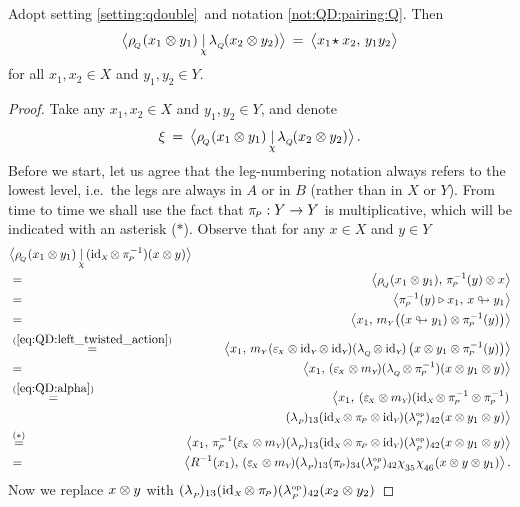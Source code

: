 \begin{prop}  \label{prop:qdouble:multiplicative}
Adopt setting \ref{setting:qdouble}\ and notation \ref{not:QD:pairing:Q}\@. Then
$$ \pairflipM{\rQ(x_1 \tens y_1)}{\lQ(x_2 \tens y_2)}
        \:=\:  \pairM{x_1 \!\star x_2}{y_1 y_2} $$
for all\/ $x_1,x_2 \in X$ and\/ $y_1,y_2 \in Y$.
\end{prop}
\begin{proof}
Take any $x_1,x_2 \in X$ and\/ $y_1,y_2 \in Y$, and denote
$$ \xi \:=\: \pairflipM{\rQ(x_1 \tens y_1)}{\lQ(x_2 \tens y_2)}. $$
Before we start, let us agree that the leg-numbering notation always refers to the
lowest level, i.e.\ the legs are always in $A$ or in $B$ (rather than in $X$ or $Y$).
From time to time we shall use the fact that $\pi_{\scriptscriptstyle \! P} : Y \rightarrow Y$ is multiplicative,
which will be indicated with an asterisk ($*$).
Observe that for any $x\in X$ and $y\in Y$
\begin{eqnarray*}
\lefteqn{\pairflipM{\rQ(x_1 \tens y_1)}{(\idX \tens \piP^{-1})(x \tens y)}}
\\&=&
\pairM{\rQ(x_1 \tens y_1)}{\piP^{-1}(y) \tens x}
\\&=&
\pairM{\piP^{-1}(y) \lact x_1}{x \ltact y_1}
\\&=&
\pairM{x_1}{\mult{Y} \! \left((x \ltact y_1) \tens \piP^{-1}(y) \vertM\right)}
\\&\stackrel{(\ref{eq:QD:left_twisted_action})}{=}&
\pairM{x_1}{\mult{Y} (\epsX \tens \idY \tens \idY)
             (\lQ \tens \idY)\left(x \tens y_1 \tens \piP^{-1}(y) \vertM\right)}
\\&=&
\pairM{x_1}{(\epsX \tens \mult{Y}\!)
                (\lQ \tens \piP^{-1})(x \tens y_1 \tens y)}
\\&\stackrel{(\ref{eq:QD:alpha})}{=}&
\left\langle x_1,\: (\epsX \tens \mult{Y}\!)
      (\idX \tens \piP^{-1} \tens \piP^{-1})
\right. \\&& \hspace{5em}\left.
   (\lp)_{13} (\idX \tens \piP \tens \idY)
      (\lpop)_{42} (x \tens y_1 \tens y)  \right \rangle
\\&\stackrel{(*)}{=}&
\pairM{x_1}{\piP^{-1} (\epsX \tens  \mult{Y}\!) (\lp)_{13}
       (\idX \tens \piP \tens \idY)  (\lpop)_{42} (x \tens y_1 \tens y)}
\\&=&
\pairM{R^{-1}(x_1)}{(\epsX \tens  \mult{Y}\!) (\lp)_{13}
       (\piP)_{34}  (\lpop)_{42} \flipsub{35} \flipsub{46} (x \tens y \tens y_1)}.
\end{eqnarray*}
Now we replace $x\otimes y$ with $(\lambda_{_P\!})_{13}  (\mbox{\rm id}_{\scriptscriptstyle X\!} \otimes \pi_{\scriptscriptstyle \! P})  (\lambda^{\scriptscriptstyle \rm op}_{_P\!})_{42}(x_2 \otimes y_2)$

\end{proof}
